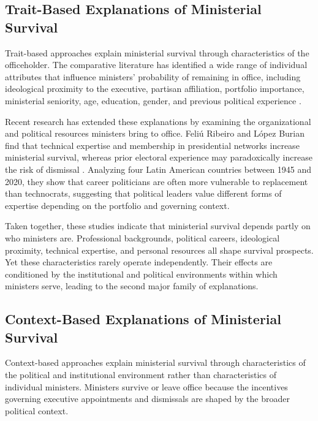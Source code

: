 \documentclass[doc, 12pt, a4paper,floatsintext]{apa7}
\begin{document}
\subsection{Trait-Based Explanations of Ministerial Survival}
%
Trait-based approaches explain ministerial survival through characteristics of the officeholder. The comparative literature has identified a wide range of individual attributes that influence ministers' probability of remaining in office, including ideological proximity to the executive, partisan affiliation, portfolio importance, ministerial seniority, age, education, gender, and previous political experience \parencite{huber_replacing_2008,dewan_corrective_2005,fischer_duration_2012}.

Recent research has extended these explanations by examining the organizational and political resources ministers bring to office. Feliú Ribeiro and López Burian find that technical expertise and membership in presidential networks increase ministerial survival, whereas prior electoral experience may paradoxically increase the risk of dismissal \parencite{feliu_ribeiro_foreign_2023}. Analyzing four Latin American countries between 1945 and 2020, they show that career politicians are often more vulnerable to replacement than technocrats, suggesting that political leaders value different forms of expertise depending on the portfolio and governing context.

Taken together, these studies indicate that ministerial survival depends partly on who ministers are. Professional backgrounds, political careers, ideological proximity, technical expertise, and personal resources all shape survival prospects. Yet these characteristics rarely operate independently. Their effects are conditioned by the institutional and political environments within which ministers serve, leading to the second major family of explanations.
%
%
\subsection{Context-Based Explanations of Ministerial Survival}

Context-based approaches explain ministerial survival through characteristics of the political and institutional environment rather than characteristics of individual ministers. Ministers survive or leave office because the incentives governing executive appointments and dismissals are shaped by the broader political context.
\end{document}
